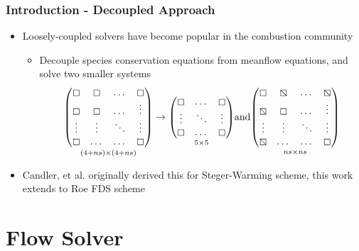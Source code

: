 \documentclass{beamer}
\begin{document}
\begin{frame}
  \frametitle{Introduction - Decoupled Approach}
  \begin{itemize}
    \item Loosely-coupled solvers have become popular in the combustion
      community
      \begin{itemize}
        \item Decouple species conservation equations from meanflow equations,
          and solve two smaller systems
         \[
           \underset{(4+ns) \times (4+ns)}
           {\begin{pmatrix}
             \boxempty & \boxempty & \dots  & \boxempty \\
             \boxempty & \boxempty & \dots  & \vdots \\
             \vdots    & \vdots    & \ddots & \vdots \\
             \boxempty & \dots     & \dots  & \boxempty
           \end{pmatrix}}
           \to
           \underset{5 \times 5}
           {\begin{pmatrix}
             \boxempty & \dots  & \boxempty \\
             \vdots    & \ddots & \vdots \\
             \boxempty & \dots  & \boxempty
           \end{pmatrix}}
           \text{and}
           \underset{ns \times ns}
           {\begin{pmatrix}
             \boxempty  & \boxbslash & \dots  & \boxbslash \\
             \boxbslash & \boxempty  & \dots  & \vdots \\
             \vdots     & \vdots     & \ddots & \vdots \\
             \boxbslash & \dots      & \dots  & \boxempty
           \end{pmatrix}}
         \]
    \end{itemize}
  \item Candler, et al. originally derived this for
    Steger-Warming scheme, this work extends to Roe FDS scheme
  \end{itemize}
\end{frame}

\section{Flow Solver}
\end{document}
